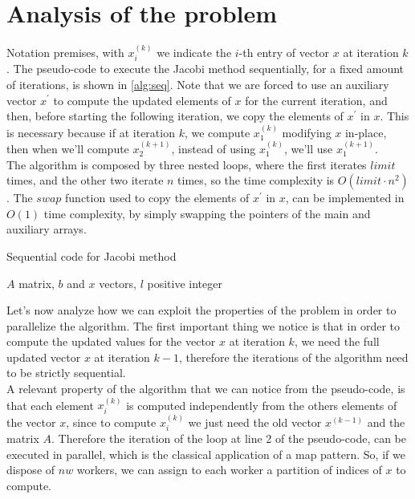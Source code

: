 \documentclass[12pt]{article}
\begin{document}
	\section{Analysis of the problem}
	Notation premises, with $x_i^{(k)}$ we indicate the $i$-th entry of vector $x$ at iteration $k$. The pseudo-code to execute the Jacobi method sequentially, for a fixed amount of iterations, is shown in \ref{alg:seq}. Note that we are forced to use an auxiliary vector $x^\prime$ to compute the updated elements of $x$ for the current iteration, and then, before starting the following iteration, we copy the elements of $x^\prime$ in $x$. This is necessary because if at iteration $k$, we compute $x^{(k)}_1$ modifying $x$ in-place, then when we'll compute $x^{(k+1)}_2$, instead of using $x^{(k)}_1$, we'll use $x^{(k+1)}_1$.\\
	The algorithm is composed by three nested loops, where the first iterates $limit$ times, and the other two iterate $n$ times, so the time complexity is $O(limit\cdot n^2)$. The $swap$ function used to copy the elements of $x^\prime$ in $x$, can be implemented in $O(1)$ time complexity, by simply swapping the pointers of the main and auxiliary arrays.
	\begin{algorithm}[H]
		\caption{Sequential code for Jacobi method}\label{alg:seq}
		\begin{algorithmic}[1]
			\Require $A$ matrix, $b$ and $x$ vectors, $l$ positive integer
			\EndIf
			\EndFor
			\EndFor
			\EndFor
		\end{algorithmic}
	\end{algorithm}
	\noindent Let's now analyze how we can exploit the properties of the problem in order to parallelize the algorithm. The first important thing we notice is that in order to compute the updated values for the vector $x$ at iteration $k$, we need the full updated vector $x$ at iteration $k-1$, therefore the iterations of the algorithm need to be strictly sequential.\\
	A relevant property of the algorithm that we can notice from the pseudo-code, is that each element $x_i^{(k)}$ is computed independently from the others elements of the vector $x$, since to compute $x_i^{(k)}$ we just need the old vector $x^{(k-1)}$ and the matrix $A$. Therefore the iteration of the loop at line 2 of the pseudo-code, can be executed in parallel, which is the classical application of a map pattern. So, if we dispose of $nw$ workers, we can assign to each worker a partition of indices of $x$ to compute.\\
\end{document}
